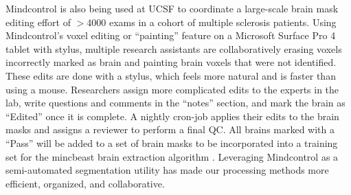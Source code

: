 
Mindcontrol is also being used at UCSF to coordinate a large-scale brain mask editing effort of $>$4000 exams in a cohort of multiple sclerosis patients. Using Mindcontrol's voxel editing or ``painting'' feature on a Microsoft Surface Pro 4 tablet with stylus, multiple research assistants are collaboratively erasing voxels incorrectly marked as brain and painting brain voxels that were not identified.  These edits are done with a stylus, which feels more natural and is faster than using a mouse. Researchers assign more complicated edits to the experts in the lab, write questions and comments in the ``notes'' section, and mark the brain as ``Edited'' once it is complete. A nightly cron-job applies their edits to the brain masks and assigns a reviewer to perform a final QC. All brains marked with a ``Pass'' will be added to a set of brain masks to be incorporated into a training set for the mincbeast brain extraction algorithm \cite{eskildsen2012beast}. Leveraging Mindcontrol as a semi-automated segmentation utility has made our processing methods more efficient, organized, and collaborative.